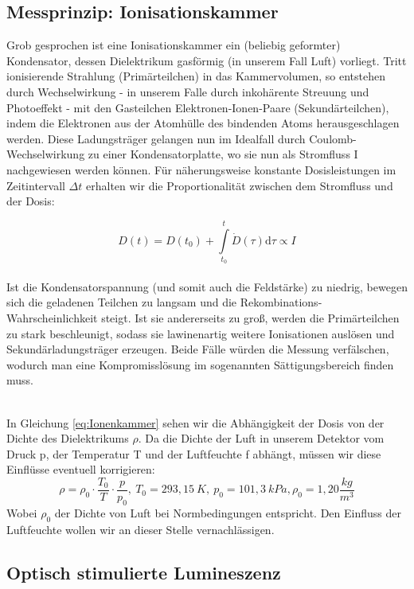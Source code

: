 \subsection{Messprinzip: Ionisationskammer}
Grob gesprochen ist eine Ionisationskammer ein (beliebig geformter) Kondensator, dessen Dielektrikum gasförmig (in unserem Fall Luft) vorliegt. Tritt ionisierende Strahlung (Primärteilchen) in das Kammervolumen, so entstehen durch Wechselwirkung - in unserem Falle durch inkohärente Streuung und Photoeffekt - mit den Gasteilchen Elektronen-Ionen-Paare (Sekundärteilchen), indem die Elektronen aus der Atomhülle des bindenden Atoms herausgeschlagen werden. Diese Ladungsträger gelangen nun im Idealfall durch Coulomb-Wechselwirkung zu einer Kondensatorplatte, wo sie nun als Stromfluss I nachgewiesen werden können. Für näherungsweise konstante Dosisleistungen im Zeitintervall $\Delta t$ erhalten wir die Proportionalität zwischen dem Stromfluss und der Dosis:

\begin{equation} \label{eq:Ionenkammer}
	D(t) = D(t_0) + \int \limits_{t_0}^{t} \dot{D}(\tau) \mathrm{d}\tau \propto I
\end{equation}
\ \\
Ist die Kondensatorspannung (und somit auch die Feldstärke) zu niedrig, bewegen sich die geladenen Teilchen zu langsam und die Rekombinations-Wahrscheinlichkeit steigt. Ist sie andererseits zu groß, werden die Primärteilchen zu stark beschleunigt, sodass sie lawinenartig weitere Ionisationen auslösen und Sekundärladungsträger erzeugen. Beide Fälle würden die Messung verfälschen, wodurch man eine Kompromisslösung im sogenannten Sättigungsbereich finden muss.

\ \\
In Gleichung \ref{eq:Ionenkammer} sehen wir die Abhängigkeit der Dosis von der Dichte des Dielektrikums $\rho$. Da die Dichte der Luft in unserem Detektor vom Druck p, der Temperatur T und der Luftfeuchte f abhängt, müssen wir diese Einflüsse eventuell korrigieren:
\begin{equation}
	\rho = \rho_0 \cdot \frac{T_0}{T} \cdot \frac{p}{p_0} ,
	\ T_0 = 293,15\ K,\ p_0 = 101,3\ kPa, \rho_0 =1,20 \frac{kg}{m^3}
    \label{formel:kappa}
\end{equation}
Wobei $\rho_0$ der Dichte von Luft bei Normbedingungen entspricht. Den Einfluss der Luftfeuchte wollen wir an dieser Stelle vernachlässigen. \cite{PA_neu}


\subsection{Optisch stimulierte Lumineszenz}

